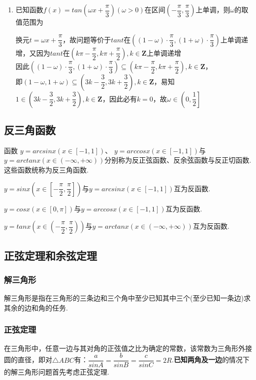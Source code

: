 \begin{enumerate}
\begin{jieda}
    \end{jieda}
    \item 已知函数$f(x) = tan\left(\omega x + \dfrac{\pi}{3}\right) (\omega > 0)$在区间$\left(-\dfrac{\pi}{3}, \dfrac{\pi}{3}\right)$上单调，则$\omega$的取值范围为\blkda{$\left(0, \dfrac{1}{2}\right]$}
    \begin{jieda}
        换元$t = \omega x + \dfrac{\pi}{3}$，故问题等价于$tant$在$\left((1-\omega) \cdot \dfrac{\pi}{3}, (1+\omega) \cdot \dfrac{\pi}{3}\right)$上单调递增，又因为$tant$在$\left(k\pi - \dfrac{\pi}{2}, k\pi+\dfrac{\pi}{2} \right), k \in \mathbf{Z}$上单调递增 \\
        因此$\left((1-\omega) \cdot \dfrac{\pi}{3}, (1+\omega) \cdot \dfrac{\pi}{3}\right) \subseteq \left(k\pi - \dfrac{\pi}{2}, k\pi+\dfrac{\pi}{2} \right), k \in \mathbf{Z}$，\\
        即$\left(1-\omega, 1+\omega\right) \subseteq \left(3k-\dfrac{3}{2}, 3k+\dfrac{3}{2}\right), k \in \mathbf{Z}$，易知$1 \in \left(3k-\dfrac{3}{2}, 3k+\dfrac{3}{2}\right), k \in \mathbf{Z}$，因此必有$k = 0$，故$\omega \in \left(0, \dfrac{1}{2}\right]$
    \end{jieda}
\end{enumerate}
\subsection*{反三角函数}
函数 $y = arcsinx(x \in [-1,1])$、 $y = arccosx (x \in [-1,1])$与 $y = arctanx (x \in (-\infty, +\infty))$分别称为反正弦函数、反余弦函数与反正切函数.这些函数统称为反三角函数.
\par $y = sinx\left(x \in \left[-\dfrac{\pi}{2},\dfrac{\pi}{2}\right]\right)$与$y = arcsinx(x \in [-1,1])$互为反函数.
\par $y = cosx(x \in [0,\pi])$与$y = arccosx(x \in [-1,1])$互为反函数.
\par $y = tanx\left(x \in \left(-\dfrac{\pi}{2},\dfrac{\pi}{2}\right)\right)$与$y = arctanx(x \in (-\infty, +\infty))$互为反函数.


\subsection*{正弦定理和余弦定理}
\subsubsection*{解三角形}
解三角形是指在三角形的三条边和三个角中至少已知其中三个(至少已知一条边)求其余的边和角的任务.
\subsubsection*{正弦定理}
在三角形中，任意一边与其对角的正弦值之比为确定的常数，该常数为三角形外接圆的直径，即对$\triangle ABC$有：$\dfrac{a}{sinA} = \dfrac{b}{sinB} = \dfrac{c}{sinC} = 2R$.\textbf{已知两角及一边}的情况下的解三角形问题首先考虑正弦定理.
